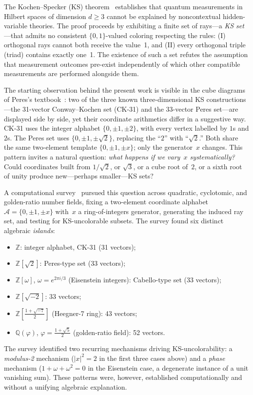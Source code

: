 \documentclass[12pt,a4paper]{article}
\newcommand{\Z}{\mathbb{Z}}
\newcommand{\Q}{\mathbb{Q}}
\begin{document}
The Kochen--Specker (KS) theorem~\cite{KochenSpecker1967} establishes
that quantum measurements in Hilbert spaces of dimension $d \geq 3$
cannot be explained by noncontextual hidden-variable theories.  The proof
proceeds by exhibiting a finite set of rays---a \emph{KS set}---that
admits no consistent $\{0,1\}$-valued coloring respecting the rules: (I)
orthogonal rays cannot both receive the value~1, and (II) every
orthogonal triple (triad) contains exactly one~1.  The existence of such
a set refutes the assumption that measurement outcomes pre-exist
independently of which other compatible measurements are performed
alongside them.

The starting observation behind the present work is visible in the
cube diagrams of Peres's textbook~\cite{Peres1993}: two of the three
known three-dimensional KS constructions---the 31-vector
Conway--Kochen set (CK-31) and the 33-vector Peres set---are displayed
side by side, yet their coordinate arithmetics differ in a suggestive
way.  CK-31 uses the integer alphabet $\{0, \pm 1, \pm 2\}$, with
every vertex labelled by $1$s and $2$s.  The Peres set uses
$\{0, \pm 1, \pm\sqrt{2}\}$, replacing the ``$2$'' with ``$\sqrt{2}$.''
Both share the same two-element template $\{0, \pm 1, \pm x\}$; only
the generator~$x$ changes.  This pattern invites a natural question:
\emph{what happens if we vary~$x$ systematically?}  Could coordinates
built from $1/\!\sqrt{2}$, or $\sqrt{3}$, or a cube root of~$2$, or a
sixth root of unity produce new---perhaps smaller---KS sets?

A computational survey~\cite{Kernaghan2026islands} pursued this
question across quadratic, cyclotomic, and golden-ratio number fields,
fixing a two-element coordinate alphabet $\mathcal{A} = \{0, \pm 1,
\pm x\}$ with~$x$ a ring-of-integers generator, generating the
induced ray set, and testing for KS-uncolorable subsets.  The survey
found six distinct algebraic \emph{islands}:
\begin{itemize}
  \item $\Z$: integer alphabet, CK-31 (31 vectors);
  \item $\Z[\sqrt{2}]$: Peres-type set (33 vectors);
  \item $\Z[\omega]$, $\omega = e^{2\pi i/3}$ (Eisenstein integers):
        Cabello-type set (33 vectors);
  \item $\Z[\sqrt{-2}]$: 33 vectors;
  \item $\Z\!\left[\tfrac{1+\sqrt{-7}}{2}\right]$ (Heegner-7 ring): 43
        vectors;
  \item $\Q(\varphi)$, $\varphi = \tfrac{1+\sqrt{5}}{2}$ (golden-ratio
        field): 52 vectors.
\end{itemize}
The survey identified two recurring mechanisms driving KS-uncolorability:
a \emph{modulus-2} mechanism ($|x|^2 = 2$ in the first three cases above)
and a \emph{phase} mechanism ($1 + \omega + \omega^2 = 0$ in the
Eisenstein case, a degenerate instance of a unit vanishing sum).  These
patterns were, however, established computationally and without a
unifying algebraic explanation.
\end{document}

